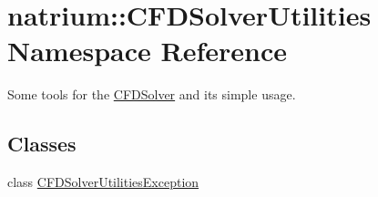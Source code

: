 \hypertarget{namespacenatrium_1_1CFDSolverUtilities}{
\section{natrium::CFDSolverUtilities Namespace Reference}
\label{namespacenatrium_1_1CFDSolverUtilities}
}


Some tools for the \hyperlink{classnatrium_1_1CFDSolver}{CFDSolver} and its simple usage.  
\subsection*{Classes}
\begin{DoxyCompactItemize}
\item 
class \hyperlink{classnatrium_1_1CFDSolverUtilities_1_1CFDSolverUtilitiesException}{CFDSolverUtilitiesException}
\end{DoxyCompactItemize}
